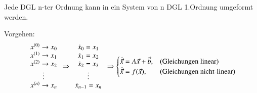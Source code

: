 
Jede DGL n-ter Ordnung kann in ein System von n DGL 1.Ordnung umgeformt werden.

Vorgehen:
\begin{equation*}
\begin{array}{c}
    x^{(0)}\rightarrow x_0\\
    x^{(1)}\rightarrow x_1\\
    x^{(2)}\rightarrow x_2\\
    \vdots\\
    x^{(n)}\rightarrow x_n\\
\end{array}
\Rightarrow
\begin{array}{c}
    \dot{x}_0 = x_1\\
    \dot{x}_1 = x_2\\
    \dot{x}_2 = x_3\\
    \vdots\\
    \dot{x}_{n-1} = x_n\\
\end{array}
\Rightarrow
\begin{cases}
    \dot{\vec{x}} = A\vec{x}+\vec{b}, & \text{(Gleichungen linear)}\\
    \dot{\vec{x}} = f(\vec{x}),  & \text{(Gleichungen nicht-linear)}\\
\end{cases}
\end{equation*}

